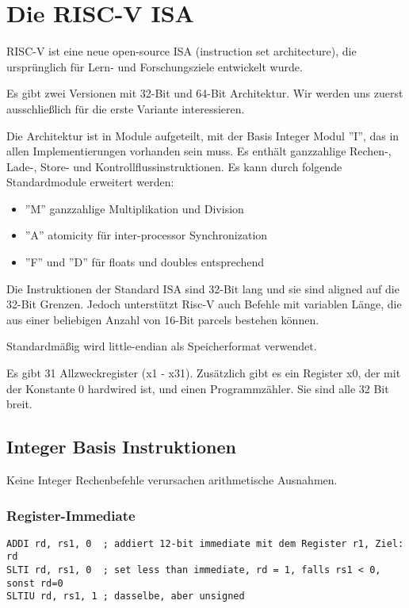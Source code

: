 \section{Die RISC-V ISA}

RISC-V ist eine neue open-source ISA (instruction set architecture), die
ursprünglich für Lern- und Forschungsziele entwickelt wurde.

Es gibt zwei Versionen mit 32-Bit und 64-Bit Architektur. Wir werden uns
zuerst ausschließlich für die erste Variante interessieren.

Die Architektur ist in Module aufgeteilt, mit der Basis Integer Modul  ''I'',
das in allen Implementierungen vorhanden sein muss. Es enthält ganzzahlige
Rechen-, Lade-, Store- und Kontrollflussinstruktionen. Es kann durch folgende
Standardmodule erweitert werden:

\begin{itemize}
\item ''M'' ganzzahlige Multiplikation und Division
\item ''A'' atomicity für inter-processor Synchronization
\item ''F'' und ''D'' für floats und doubles entsprechend
\end{itemize}

Die Instruktionen der Standard ISA sind 32-Bit lang und sie sind aligned auf die
32-Bit Grenzen. Jedoch unterstützt Risc-V auch Befehle mit variablen Länge, die
aus einer beliebigen Anzahl von 16-Bit parcels bestehen können.

Standardmäßig wird little-endian als Speicherformat verwendet.

Es gibt 31 Allzweckregister (x1 - x31). Zusätzlich gibt es ein Register x0, der mit der Konstante 0 hardwired ist, und einen Programmzähler. Sie sind alle 32 Bit breit.

\subsection{Integer Basis Instruktionen}

Keine Integer Rechenbefehle verursachen arithmetische Ausnahmen.

\subsubsection{Register-Immediate}

\begin{lstlisting}
ADDI rd, rs1, 0  ; addiert 12-bit immediate mit dem Register r1, Ziel: rd
SLTI rd, rs1, 0  ; set less than immediate, rd = 1, falls rs1 < 0, sonst rd=0
SLTIU rd, rs1, 1 ; dasselbe, aber unsigned
\end{lstlisting}

